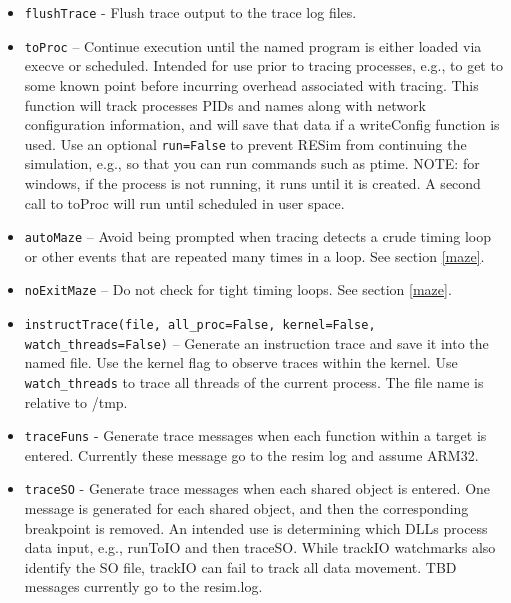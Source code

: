 \documentclass[titlepage]{article}
\begin{document}
\begin{itemize}
The \textit{outfile} is the name of the file into which the messages should be written.

\item {\tt flushTrace} - Flush trace output to the trace log files.

\item {\tt toProc} – Continue execution until the named program is either loaded via execve or scheduled.  Intended for use prior to tracing processes, e.g., to get to some known point before incurring overhead associated with tracing.   This function will track processes PIDs and names along with network configuration information, and will save that data if a writeConfig function is used.
Use an optional {\tt run=False} to prevent RESim from continuing the simulation, e.g., so that you can run commands such as ptime.
NOTE: for windows, if the process is not running, it runs until it is created.  A second call to toProc will run until scheduled in user space.

\item {\tt autoMaze} -- Avoid being prompted when tracing detects a crude timing loop or other events that are repeated many times in a loop.
See section \ref{maze}.

\item {\tt noExitMaze} -- Do not check for tight timing  loops.
See section \ref{maze}.

\item {\tt instructTrace(file, all\_proc=False, kernel=False, watch\_threads=False)} -- Generate an instruction trace and save it into the named file. Use the kernel
flag to observe traces within the kernel. Use {\tt watch\_threads} to trace all threads of the current process.  The file name is relative to /tmp.

\item {\tt traceFuns} - Generate trace messages when each function within a target is entered.  Currently these message go to the resim log and assume ARM32.

\item {\tt traceSO} - Generate trace messages when each shared object is entered.  One message is generated for each shared object, and then the corresponding
breakpoint is removed.  An intended use is determining which DLLs process data input, e.g., runToIO and then traceSO.  While trackIO watchmarks also identify
the SO file, trackIO can fail to track all data movement.  TBD messages currently go to the resim.log.

\end{itemize}
\end{document}
